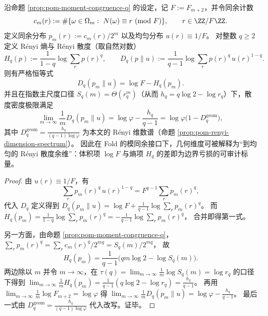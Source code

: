 
\begin{corollary}\label{cor:pom-mod-congruence-renyi-divergence-codim}
沿命题 \ref{prop:pom-moment-congruence-q} 的设定，记 \(F:=F_{m+2}\)，并令同余计数
\[
c_m(r):=\#\{\omega\in\Omega_m:\ N(\omega)\equiv r\ (\mathrm{mod}\ F)\},
\qquad r\in\ZZ/F\ZZ.
\]
定义同余分布 \(p_m(r):=c_m(r)/2^m\) 以及均匀分布 \(u(r)\equiv 1/F\)。
对整数 \(q\ge 2\) 定义 Rényi 熵与 Rényi 散度（取自然对数）
\[
H_q(p):=\frac{1}{1-q}\log\sum_{r}p(r)^q,
\qquad
D_q(p\|u):=\frac{1}{q-1}\log\sum_{r}p(r)^q\,u(r)^{1-q}.
\]
则有严格恒等式
\[
\boxed{\;
D_q(p_m\|u)=\log F-H_q(p_m).\;}
\]
并且在指数主尺度口径 \(S_q(m)=\Theta(r_q^m)\)（从而 \(h_q=q\log 2-\log r_q\)）下，散度密度极限满足
\[
\boxed{\;
\lim_{m\to\infty}\frac{1}{m}D_q(p_m\|u)
=\log\varphi-\frac{h_q}{q-1}
=\log\varphi\bigl(1-D_q^{\mathrm{geom}}\bigr),\;}
\]
其中 \(D_q^{\mathrm{geom}}=\frac{h_q}{(q-1)\log\varphi}\) 为本文的 Rényi 维数谱（命题 \ref{prop:pom-renyi-dimension-spectrum}）。
因此在 Fold 的模同余接口下，几何维度可被解释为“到均匀的 Rényi 散度余维”：体积项 \(\log F\) 与熵项 \(H_q\) 的差即为边界亏损的可审计标量。
\end{corollary}
\begin{proof}
由 \(u(r)\equiv 1/F\)，有
\[
\sum_r p_m(r)^q\,u(r)^{1-q}=F^{q-1}\sum_r p_m(r)^q,
\]
代入 \(D_q\) 定义得到
\(
D_q(p_m\|u)=\log F+\frac{1}{q-1}\log\sum_r p_m(r)^q
\)。
而
\(
H_q(p_m)=\frac{1}{1-q}\log\sum_r p_m(r)^q
=-\frac{1}{q-1}\log\sum_r p_m(r)^q
\)，
合并即得第一式。
\par
另一方面，由命题 \ref{prop:pom-moment-congruence-q}，
\(
\sum_r p_m(r)^q=\sum_r c_m(r)^q/2^{mq}=S_q(m)/2^{mq}
\)，
故
\[
H_q(p_m)=\frac{1}{q-1}\bigl(qm\log 2-\log S_q(m)\bigr).
\]
两边除以 \(m\) 并令 \(m\to\infty\)，在 \(\tau(q)=\lim_{m\to\infty}\frac{1}{m}\log S_q(m)=\log r_q\) 的口径下得到
\(
\lim_{m\to\infty}\frac{1}{m}H_q(p_m)=\frac{1}{q-1}(q\log 2-\log r_q)=\frac{h_q}{q-1}
\)。
再用 \(\lim_{m\to\infty}\frac{1}{m}\log F_{m+2}=\log\varphi\) 得
\(
\lim_{m\to\infty}\frac{1}{m}D_q(p_m\|u)=\log\varphi-\frac{h_q}{q-1}
\)。
最后一式由 \(D_q^{\mathrm{geom}}=\frac{h_q}{(q-1)\log\varphi}\) 代入改写。证毕。
\end{proof}


